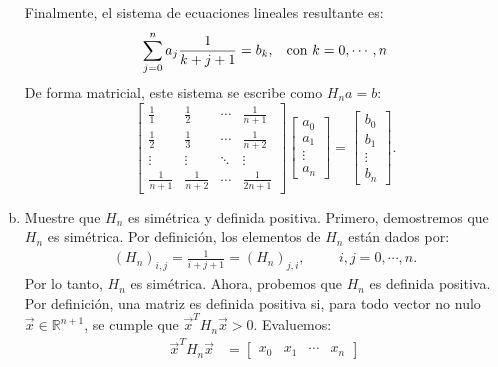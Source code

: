 \begin{homeworkProblem}
\begin{solucion}
\begin{enumerate}[a)]
          Finalmente, el sistema de ecuaciones lineales resultante es:
          \begin{align*}
            \sum_{j=0}^n a_j \frac{1}{k+j+1} = b_k, \hspace{0.3cm} \text{con } k = 0, \cdots, n
          \end{align*}
          De forma matricial, este sistema se escribe como \( H_n a = b \):
          \[
            \begin{bmatrix}
              \frac{1}{1} & \frac{1}{2} & \cdots & \frac{1}{n+1} \\
              \frac{1}{2} & \frac{1}{3} & \cdots & \frac{1}{n+2} \\
              \vdots & \vdots & \ddots & \vdots \\
              \frac{1}{n+1} & \frac{1}{n+2} & \cdots & \frac{1}{2n+1}
            \end{bmatrix}
            \begin{bmatrix}
              a_0 \\ 
              a_1 \\ 
              \vdots \\ 
              a_n
            \end{bmatrix}
            =
            \begin{bmatrix}
              b_0 \\ 
              b_1 \\ 
              \vdots \\ 
              b_n
            \end{bmatrix}.
          \]
        \item Muestre que \( H_n \) es simétrica y definida positiva.
          Primero, demostremos que \( H_n \) es simétrica. Por definición, los elementos de \( H_n \) están dados por:
          \begin{align*}
            (H_n)_{i,j} = \frac{1}{i+j+1} = (H_n)_{j,i}, \hspace{1cm} i, j = 0, \cdots, n.
          \end{align*}
          Por lo tanto, \( H_n \) es simétrica.
          Ahora, probemos que \( H_n \) es definida positiva. Por definición, una matriz es definida positiva si, para todo vector no nulo \( \vec{x} \in \mathbb{R}^{n+1} \), se cumple que \( \vec{x}^T H_n \vec{x} > 0 \). Evaluemos:
          \begin{align*}
            \vec{x}^T H_n \vec{x} & =
            \begin{bmatrix}
              x_0 & x_1 & \cdots & x_n 

\end{bmatrix}
\end{align*}
\end{enumerate}
\end{solucion}
\end{homeworkProblem}
